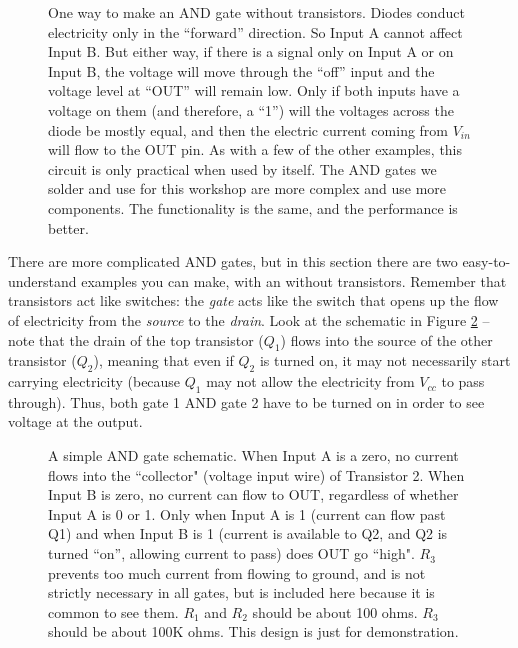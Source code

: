 \begin{figure}[!ht]
\begin{center}

\caption{One way to make an AND gate without transistors. Diodes conduct electricity only in the ``forward'' direction. So Input A cannot affect Input B. But either way, if there is a signal only on Input A or on Input B, the voltage will move through the ``off'' input and the voltage level at ``OUT'' will remain low. Only if both inputs have a voltage on them (and therefore, a ``1'') will the voltages across the diode be mostly equal, and then the electric current coming from $V_{in}$ will flow to the OUT pin. As with a few of the other examples, this circuit is only practical when used by itself. The AND gates we solder and use for this workshop are more complex and use more components. The functionality is the same, and the performance is better.}
\label{fig:diodeandgate}
\end{center}
\end{figure}


There are more complicated AND gates, but in this section there are two easy-to-understand examples you can make, with an without transistors. Remember that transistors act like switches: the \emph{gate} acts like the switch that opens up the flow of electricity from the \emph{source} to the \emph{drain}. Look at the schematic in Figure \ref{fig:simpleandgate} -- note that the drain of the top transistor ($Q_1$) flows into the source of the other transistor ($Q_2$), meaning that even if $Q_2$ is turned on, it may not necessarily start carrying electricity (because $Q_1$ may not allow the electricity from $V_{cc}$ to pass through). Thus, both gate 1 AND gate 2 have to be turned on in order to see voltage at the output.

\bigskip

\begin{figure}[!ht]
\begin{center}


\caption{A simple AND gate schematic. When Input A is a zero, no current flows into the ``collector" (voltage input wire) of Transistor 2. When Input B is zero, no current can flow to OUT, regardless of whether Input A is 0 or 1. Only when Input A is 1 (current can flow past Q1) and when Input B is 1 (current is available to Q2, and Q2 is turned ``on'', allowing current to pass) does OUT go ``high". $R_3$ prevents too much current from flowing to ground, and is not strictly necessary in all gates, but is included here because it is common to see them. $R_1$ and $R_2$ should be about 100 ohms. $R_3$ should be about 100K ohms. This design is just for demonstration.}
\label{fig:simpleandgate}
\end{center}
\end{figure}



